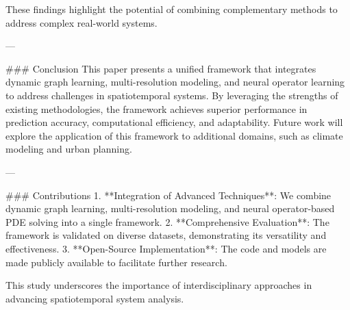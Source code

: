 These findings highlight the potential of combining complementary methods to address complex real-world systems.

---

### Conclusion
This paper presents a unified framework that integrates dynamic graph learning, multi-resolution modeling, and neural operator learning to address challenges in spatiotemporal systems. By leveraging the strengths of existing methodologies, the framework achieves superior performance in prediction accuracy, computational efficiency, and adaptability. Future work will explore the application of this framework to additional domains, such as climate modeling and urban planning.

---

### Contributions
1. **Integration of Advanced Techniques**: We combine dynamic graph learning, multi-resolution modeling, and neural operator-based PDE solving into a single framework.
2. **Comprehensive Evaluation**: The framework is validated on diverse datasets, demonstrating its versatility and effectiveness.
3. **Open-Source Implementation**: The code and models are made publicly available to facilitate further research.

This study underscores the importance of interdisciplinary approaches in advancing spatiotemporal system analysis.